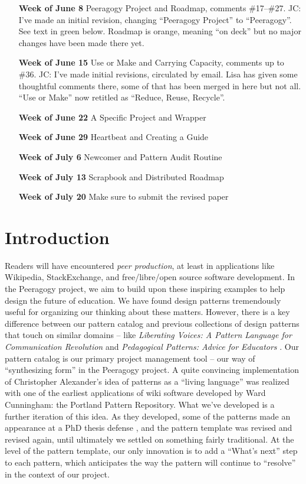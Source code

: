 \begin{itemize}
\item[{\bf Week of June 8}] Peeragogy Project and Roadmap, comments \#17--\#27.  JC: I've made an initial revision, changing ``Peeragogy Project'' to ``Peeragogy''.  See text in green below.  Roadmap is orange, meaning ``on deck'' but no major changes have been made there yet.
\item[{\bf Week of June 15}] Use or Make and Carrying Capacity, comments up to \#36.  JC: I've made initial revisions, circulated by email.  Lisa has given some thoughtful comments there, some of that has been merged in here but not all. ``Use or Make'' now retitled as ``Reduce, Reuse, Recycle''.
\item[{\bf Week of June 22}] A Specific Project and Wrapper
\item[{\bf Week of June 29}] Heartbeat and Creating a Guide
\item[{\bf Week of July 6}] Newcomer and Pattern Audit Routine
\item[{\bf Week of July 13}] Scrapbook and Distributed Roadmap
\item[{\bf Week of July 20}] Make sure to submit the revised paper
\end{itemize}

\section{Introduction}\label{sec:Introduction}

Readers will have encountered \emph{peer production}, at least in applications like Wikipedia, StackExchange, and free/libre/open source software development.   In the Peeragogy project,  we aim to build upon these inspiring examples to help design the future of education.  
We have found design patterns tremendously useful for organizing our thinking about these matters.  However, there is a key difference between our pattern catalog and previous collections of design patterns that touch on similar domains -- like \emph{Liberating Voices: A Pattern Language for Communication Revolution} \cite{schuler2008liberating} and \emph{Pedagogical Patterns: Advice for Educators} \cite{bergin2012pedagogical}.  Our pattern catalog is our primary project management tool -- our way of ``synthesizing form'' \cite{alexander1964notes} in the Peeragogy project. A quite convincing implementation of Christopher Alexander’s idea of patterns as a ``living language'' \cite[p.~xvii]{alexander1977pattern} was realized with one of the earliest applications of wiki software developed by Ward Cunningham: the Portland Pattern Repository.  What we've developed is a further iteration of this idea.   As they developed, some of the patterns made an appearance at a PhD thesis defense \cite{corneli-thesis}, and the pattern template was revised and revised again, until ultimately we settled on something fairly traditional.  At the level of the pattern template, our only innovation is to add a ``What's next'' step to each pattern, which anticipates the way the pattern will continue to ``resolve'' in the context of our project. 

